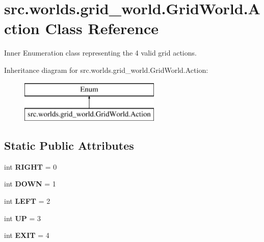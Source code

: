 \hypertarget{classsrc_1_1worlds_1_1grid__world_1_1_grid_world_1_1_action}{}\section{src.\+worlds.\+grid\+\_\+world.\+Grid\+World.\+Action Class Reference}
\label{classsrc_1_1worlds_1_1grid__world_1_1_grid_world_1_1_action}


Inner Enumeration class representing the 4 valid grid actions.  


Inheritance diagram for src.\+worlds.\+grid\+\_\+world.\+Grid\+World.\+Action\+:\begin{figure}[H]
\begin{center}
\leavevmode
\includegraphics[height=2.000000cm]{classsrc_1_1worlds_1_1grid__world_1_1_grid_world_1_1_action}
\end{center}
\end{figure}
\subsection*{Static Public Attributes}
\begin{DoxyCompactItemize}
\item 
\mbox{\label{classsrc_1_1worlds_1_1grid__world_1_1_grid_world_1_1_action_a9011b919b943b4d87bcbf51303ec11eb}} 
int {\bfseries R\+I\+G\+HT} = 0
\item 
\mbox{\label{classsrc_1_1worlds_1_1grid__world_1_1_grid_world_1_1_action_ae68d4343a84d373a69b136850e1cac31}} 
int {\bfseries D\+O\+WN} = 1
\item 
\mbox{\label{classsrc_1_1worlds_1_1grid__world_1_1_grid_world_1_1_action_a7b97fb22b60c57560edda782c6633c23}} 
int {\bfseries L\+E\+FT} = 2
\item 
\mbox{\label{classsrc_1_1worlds_1_1grid__world_1_1_grid_world_1_1_action_af13d2bac9d82bd37c5a154240cac10a9}} 
int {\bfseries UP} = 3
\item 
\mbox{\label{classsrc_1_1worlds_1_1grid__world_1_1_grid_world_1_1_action_a37efe0bfe375ce6f1119c0055d6dedf4}} 
int {\bfseries E\+X\+IT} = 4
\end{DoxyCompactItemize}


